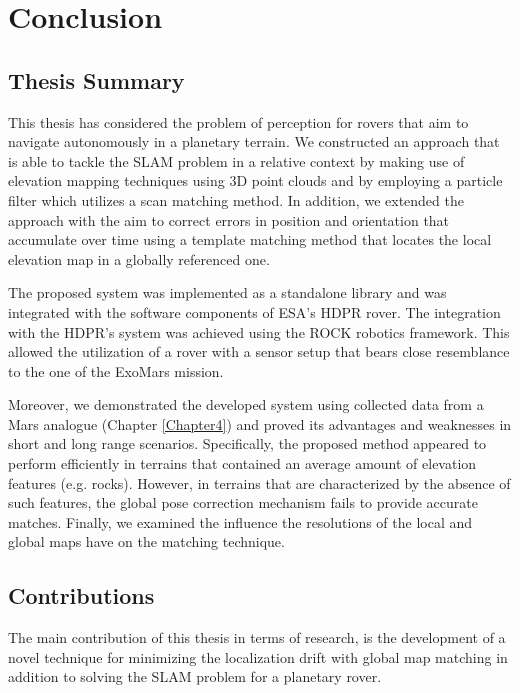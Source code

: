 \label{Chapter5}

\chapter{Conclusion}

\section{Thesis Summary}

This thesis has considered the problem of perception for rovers that
aim to navigate autonomously in a planetary terrain.
We constructed an approach that is able to tackle the SLAM problem
in a relative context by making use of elevation mapping techniques using
3D point clouds and by employing a particle filter which utilizes a
scan matching method.
In addition, we extended the approach with the aim to correct errors
in position and orientation that accumulate over time using a template
matching method that locates the local elevation map in a globally referenced
one.

The proposed system was implemented as a standalone library and was
integrated with the software components of ESA's HDPR rover.
The integration with the HDPR's system was achieved using the ROCK
robotics framework.
This allowed the utilization of a rover with a sensor setup that bears close
resemblance to the one of the ExoMars mission.

Moreover, we demonstrated the developed system using collected data
from a Mars analogue (Chapter \ref{Chapter4}) and proved its
advantages and weaknesses in short and long range scenarios.
Specifically, the proposed method appeared to perform efficiently in
terrains that contained an average amount of elevation features (e.g. rocks).
However, in terrains that are characterized by the absence of such features,
the global pose correction mechanism fails to provide accurate matches.
Finally, we examined the influence the resolutions of the local and global
maps have on the matching technique.

\section{Contributions}

The main contribution of this thesis in terms of research,
is the development of a novel technique for minimizing the localization
drift with global map matching in addition to solving the SLAM problem
for a planetary rover.

